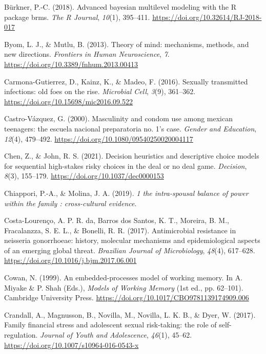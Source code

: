 \documentclass[
  donotrepeattitle,doc, 12pt, a4paper,floatsintext]{apa7}
\newlength{\cslhangindent}
\newlength{\cslentryspacingunit} %
\newenvironment{CSLReferences}[2] %
 {%
  \setlength{\parindent}{0pt}
  \ifodd #1
  \let\oldpar\par
  \def\par{\hangindent=\cslhangindent\oldpar}
  \fi
  \setlength{\parskip}{#2\cslentryspacingunit}
 }%
 {}
\begin{document}
\begin{CSLReferences}{1}{0}
\leavevmode{}%
Bürkner, P.-C. (2018). Advanced bayesian multilevel modeling with the R package brms. \emph{The R Journal}, \emph{10}(1), 395--411. \url{https://doi.org/10.32614/RJ-2018-017}

\leavevmode{}%
Byom, L. J., \& Mutlu, B. (2013). Theory of mind: mechanisms, methods, and new directions. \emph{Frontiers in Human Neuroscience}, \emph{7}. \url{https://doi.org/10.3389/fnhum.2013.00413}

\leavevmode{}%
Carmona-Gutierrez, D., Kainz, K., \& Madeo, F. (2016). Sexually transmitted infections: old foes on the rise. \emph{Microbial Cell}, \emph{3}(9), 361--362. \url{https://doi.org/10.15698/mic2016.09.522}

\leavevmode{}%
Castro-Vázquez, G. (2000). Masculinity and condom use among mexican teenagers: the escuela nacional preparatoria no. 1's case. \emph{Gender and Education}, \emph{12}(4), 479--492. \url{https://doi.org/10.1080/09540250020004117}

\leavevmode{}%
Chen, Z., \& John, R. S. (2021). Decision heuristics and descriptive choice models for sequential high-stakes risky choices in the deal or no deal game. \emph{Decision}, \emph{8}(3), 155--179. \url{https://doi.org/10.1037/dec0000153}

\leavevmode{}%
Chiappori, P.-A., \& Molina, J. A. (2019). \emph{1 the intra-spousal balance of power within the family : cross-cultural evidence}.

\leavevmode{}%
Costa-Lourenço, A. P. R. da, Barros dos Santos, K. T., Moreira, B. M., Fracalanzza, S. E. L., \& Bonelli, R. R. (2017). Antimicrobial resistance in neisseria gonorrhoeae: history, molecular mechanisms and epidemiological aspects of an emerging global threat. \emph{Brazilian Journal of Microbiology}, \emph{48}(4), 617--628. \url{https://doi.org/10.1016/j.bjm.2017.06.001}

\leavevmode{}%
Cowan, N. (1999). An embedded-processes model of working memory. In A. Miyake \& P. Shah (Eds.), \emph{Models of Working Memory} (1st ed., pp. 62--101). Cambridge University Press. \url{https://doi.org/10.1017/CBO9781139174909.006}

\leavevmode{}%
Crandall, A., Magnusson, B., Novilla, M., Novilla, L. K. B., \& Dyer, W. (2017). Family financial stress and adolescent sexual risk-taking: the role of self-regulation. \emph{Journal of Youth and Adolescence}, \emph{46}(1), 45--62. \url{https://doi.org/10.1007/s10964-016-0543-x}


\end{CSLReferences}
\end{document}
